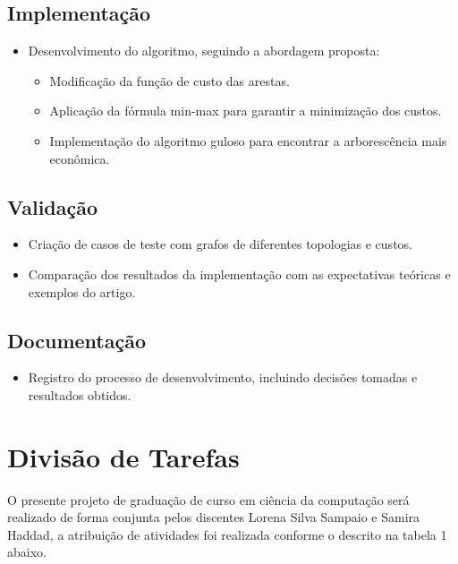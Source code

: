 \documentclass[12pt,a4paper]{article}
\begin{document}
\subsection{Implementação}
\begin{itemize}
    \item Desenvolvimento do algoritmo, seguindo a abordagem proposta:
    \begin{itemize}
        \item Modificação da função de custo das arestas.
        \item Aplicação da fórmula min-max para garantir a minimização dos custos.
        \item Implementação do algoritmo guloso para encontrar a arborescência mais econômica.
    \end{itemize}
\end{itemize}

\subsection{Validação}
\begin{itemize}
    \item Criação de casos de teste com grafos de diferentes topologias e custos.
    \item Comparação dos resultados da implementação com as expectativas teóricas e exemplos do artigo.
\end{itemize}

\subsection{Documentação}
\begin{itemize}
    \item Registro do processo de desenvolvimento, incluindo decisões tomadas e resultados obtidos.
\end{itemize}

\section{Divisão de Tarefas}
O presente projeto de graduação de curso em ciência da computação será realizado de forma conjunta pelos discentes Lorena Silva Sampaio e Samira Haddad, a atribuição de atividades foi realizada conforme o descrito na tabela 1 abaixo.
\end{document}
